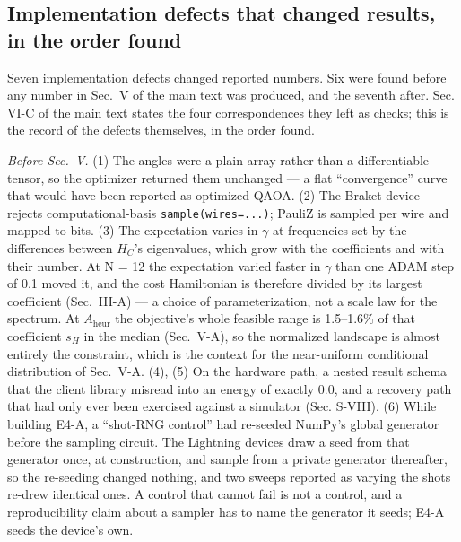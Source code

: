 \documentclass[journal]{IEEEtran}
\begin{document}
\subsection{Implementation defects that changed results, in the order found}


Seven implementation defects changed reported numbers. Six were found before any number in Sec.~V of the main text was produced, and the seventh after. Sec. VI-C of the main text states the four correspondences they left as checks; this is the record of the defects themselves, in the order found.


\textit{Before Sec.~V.} (1) The angles were a plain array rather than a differentiable tensor, so the optimizer returned them unchanged --- a flat ``convergence'' curve that would have been reported as optimized QAOA. (2) The Braket device rejects computational-basis \texttt{sample(wires=...)}; PauliZ is sampled per wire and mapped to bits. (3) The expectation varies in $\gamma$ at frequencies set by the differences between $H_{C}$'s eigenvalues, which grow with the coefficients and with their number. At N = 12 the expectation varied faster in $\gamma$ than one ADAM step of 0.1 moved it, and the cost Hamiltonian is therefore divided by its largest coefficient (Sec.~III-A) --- a choice of parameterization, not a scale law for the spectrum. At $A_{\mathrm{heur}}$ the objective's whole feasible range is 1.5--1.6\% of that coefficient $s_{H}$ in the median (Sec.~V-A), so the normalized landscape is almost entirely the constraint, which is the context for the near-uniform conditional distribution of Sec.~V-A. (4), (5) On the hardware path, a nested result schema that the client library misread into an energy of exactly 0.0, and a recovery path that had only ever been exercised against a simulator (Sec. S-VIII). (6) While building E4-A, a ``shot-RNG control'' had re-seeded NumPy's global generator before the sampling circuit. The Lightning devices draw a seed from that generator once, at construction, and sample from a private generator thereafter, so the re-seeding changed nothing, and two sweeps reported as varying the shots re-drew identical ones. A control that cannot fail is not a control, and a reproducibility claim about a sampler has to name the generator it seeds; E4-A seeds the device's own.
\end{document}
